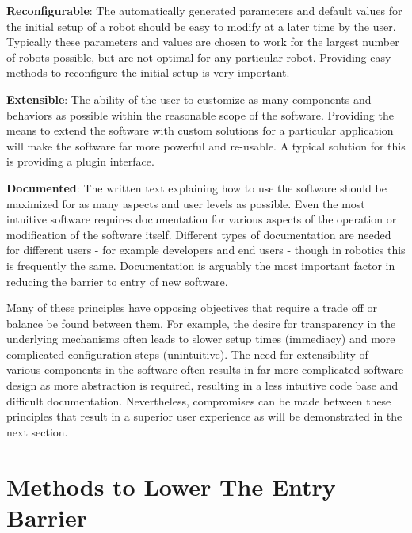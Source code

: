 \documentclass[10pt,journal,compsoc]{joser1}
\begin{document}
{{\bf Reconfigurable}: The automatically generated parameters and default values for the initial setup of a robot should be easy to modify at a later time by the user. Typically these parameters and values are chosen to work for the largest number of robots possible, but are not optimal for any particular robot. Providing easy methods to reconfigure the initial setup is very important. 

{\bf Extensible}: The ability of the user to customize as many components and behaviors as possible within the reasonable scope of the software. Providing the means to extend the software with custom solutions for a particular application will make the software far more powerful and re-usable. A typical solution for this is providing a plugin interface.

{\bf Documented}: The written text explaining how to use the software should be maximized for as many aspects and user levels as possible. Even the most intuitive software requires documentation for various aspects of the operation or modification of the software itself. Different types of documentation are needed for different users - for example developers and end users - though in robotics this is frequently the same. Documentation is arguably the most important factor in reducing the barrier to entry of new software.

Many of these principles have opposing objectives that require a trade off or balance be found between them. For example, the desire for transparency in the underlying mechanisms often leads to slower setup times (immediacy) and more complicated configuration steps (unintuitive). The need for extensibility of various components in the software often results in far more complicated software design as more abstraction is required, resulting in a less intuitive code base and difficult documentation. Nevertheless, compromises can be made between these principles that result in a superior user experience as will be demonstrated in the next section.

\section{Methods to Lower The Entry Barrier}
\label{sec::lowering_barriers}

}
\end{document}
